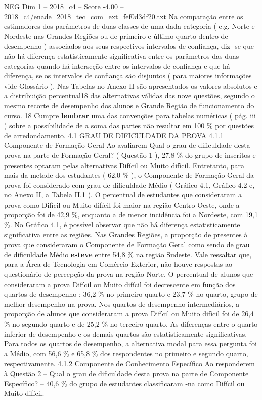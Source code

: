 \begin{textsample}{NEG Dim 1 – 2018\_c4 – Score -4.00 – 2018\_c4/enade\_2018\_tec\_com\_ext\_fef0d3df20.txt}
Na comparação entre os estimadores dos parâmetros de duas classes de uma dada categoria ( e.g.
Norte e Nordeste nas Grandes Regiões ou de primeiro e último quarto dentro de desempenho ) associados aos seus respectivos intervalos de confiança, diz -se que não há diferença estatisticamente significativa entre os parâmetros das duas categorias quando há interseção entre os intervalos de confiança e que há diferença, se os intervalos de confiança são disjuntos ( para maiores informações vide Glossário ).
Nas Tabelas no Anexo II são apresentados os valores absolutos e a distribuição percentual18 das alternativas válidas das nove questões, segundo o mesmo recorte de desempenho dos alunos e Grande Região de funcionamento do curso. 18 Cumpre \textbf{lembrar} uma das convenções para tabelas numéricas ( pág. iii ) sobre a possibilidade de a soma das partes não resultar em 100 \% por questões de arredondamento. 4.1 GRAU DE DIFICULDADE DA PROVA 4.1.1 Componente de Formação Geral Ao avaliarem Qual o grau de dificuldade desta prova na parte de Formação Geral? ( Questão 1 ), 27,8 \% do grupo de inscritos e presentes optaram pelas alternativas Difícil ou Muito difícil.
Entretanto, para mais da metade dos estudantes ( 62,0 \% ), o Componente de Formação Geral da prova foi considerado com grau de dificuldade Médio ( Gráfico 4.1, Gráfico 4.2 e, no Anexo II, a Tabela II.1 ).
O percentual de estudantes que consideraram a prova como Difícil ou Muito difícil foi maior na região Centro-Oeste, onde a proporção foi de 42,9 \%, enquanto a de menor incidência foi a Nordeste, com 19,1 \%.
No Gráfico 4.1, é possível observar que não há diferença estatisticamente significativa entre as regiões.
Nas Grandes Regiões, a proporção de presentes à prova que consideraram o Componente de Formação Geral como sendo de grau de dificuldade Médio \textbf{esteve} entre 54,8 \% na região Sudeste.
Vale ressaltar que, para a Área de Tecnologia em Comércio Exterior, não houve respostas ao questionário de percepção da prova na região Norte.
O percentual de alunos que consideraram a prova Difícil ou Muito difícil foi decrescente em função dos quartos de desempenho : 36,2 \% no primeiro quarto e 23,7 \% no quarto, grupo de melhor desempenho na prova.
Nos quartos de desempenho intermediários, a proporção de alunos que consideraram a prova Difícil ou Muito difícil foi de 26,4 \% no segundo quarto e de 25,2 \% no terceiro quarto.
As diferenças entre o quarto inferior de desempenho e os demais quartos são estatisticamente significativas.
Para todos os quartos de desempenho, a alternativa modal para essa pergunta foi a Médio, com 56,6 \% e 65,8 \% dos respondentes no primeiro e segundo quarto, respectivamente. 4.1.2 Componente de Conhecimento Específico Ao responderem à Questão 2 – Qual o grau de dificuldade desta prova na parte de Componente Específico? – 40,6 \% do grupo de estudantes classificaram -na como Difícil ou Muito difícil.

\end{textsample}
